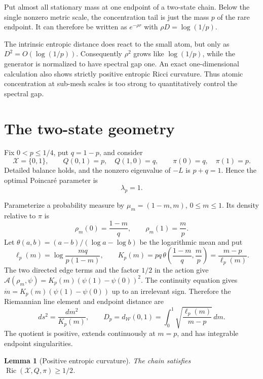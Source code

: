 \documentclass[11pt]{article}
\newtheorem{lemma}{Lemma}
\newcommand{\W}{\mathcal W}
\newcommand{\Ric}{\operatorname{Ric}}
\begin{document}
Put almost all stationary mass at one endpoint of a two-state chain. Below
the single nonzero metric scale, the concentration tail is just the mass
$p$ of the rare endpoint. It can therefore be written as
$e^{-\rho r}$ with $\rho D=\log(1/p)$.

The intrinsic entropic distance does react to the small atom, but only as
$D^2=O(\log(1/p))$. Consequently $\rho^2$ grows like
$\log(1/p)$, while the generator is normalized to have spectral gap one.
An exact one-dimensional calculation also shows strictly positive entropic
Ricci curvature. Thus atomic concentration at sub-mesh scales is too strong
to quantitatively control the spectral gap.

\section{The two-state geometry}

Fix $0<p\leq1/4$, put $q=1-p$, and consider
\[
 \mathcal X=\{0,1\},\qquad
 Q(0,1)=p,\quad Q(1,0)=q,\qquad
 \pi(0)=q,\quad\pi(1)=p.
\]
Detailed balance holds, and the nonzero eigenvalue of $-L$ is $p+q=1$.
Hence the optimal Poincar\'e parameter is
\begin{equation}\label{eq:gap}
                         \lambda_p=1.
\end{equation}

Parameterize a probability measure by $\mu_m=(1-m,m)$, $0\leq m\leq1$.
Its density relative to $\pi$ is
\[
 \rho_m(0)=\frac{1-m}{q},\qquad \rho_m(1)=\frac m p.
\]
Let $\theta(a,b)=(a-b)/(\log a-\log b)$ be the logarithmic mean and put
\[
 \ell_p(m)=\log\frac{mq}{p(1-m)},\qquad
 K_p(m)=pq\,\theta\!\left(\frac{1-m}{q},\frac m p\right)
        =\frac{m-p}{\ell_p(m)}.
\]
The two directed edge terms and the factor $1/2$ in the action give
$\mathcal A(\rho_m,\psi)=K_p(m)(\psi(1)-\psi(0))^2$.
The continuity equation gives
$\dot m=K_p(m)(\psi(1)-\psi(0))$ up to an irrelevant sign. Therefore the
Riemannian line element and endpoint distance are
\begin{equation}\label{eq:metric}
 ds^2=\frac{dm^2}{K_p(m)},\qquad
 D_p=d_{\W}(0,1)
 =\int_0^1\sqrt{\frac{\ell_p(m)}{m-p}}\,dm.
\end{equation}
The quotient is positive, extends continuously at $m=p$, and has integrable
endpoint singularities.

\begin{lemma}[Positive entropic curvature]\label{lem:ric}
The chain satisfies $\Ric(\mathcal X,Q,\pi)\geq1/2$.
\end{lemma}
\end{document}
